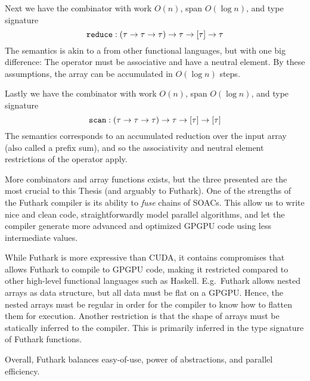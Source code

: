 Next we have the combinator  with work $O(n)$, span $O(\log n)$, and
type signature
\begin{equation}
\mathtt{reduce}:(\tau \to \tau \to \tau) \to \tau \to \mathtt{[}\tau\mathtt{]} \to \tau
\end{equation}
The semantics is akin to a  from other functional languages, but with
one big difference: The operator must be associative and have a neutral
element. By these assumptions, the array can be accumulated in $O(\log n)$
steps.

Lastly we have the combinator  with work $O(n)$, span $O(\log n)$, and
type signature
\begin{equation}
\mathtt{scan}:(\tau \to \tau \to \tau) \to \tau \to \mathtt{[}\tau\mathtt{]} \to \mathtt{[}\tau\mathtt{]}
\end{equation}
The semantics corresponds to an accumulated reduction over the input array (also
called a prefix sum), and so the associativity and neutral element restrictions
of the operator apply.

More combinators and array functions exists, but the three presented are the
most crucial to this Thesis (and arguably to Futhark). One of the strengths of
the Futhark compiler is its ability to \textit{fuse} chains of SOACs. This allow
us to write nice and clean code, straightforwardly model parallel algorithms,
and let the compiler generate more advanced and optimized GPGPU code using less
intermediate values.

While Futhark is more expressive than CUDA, it contains compromises that allows
Futhark to compile to GPGPU code, making it restricted compared to other
high-level functional languages such as Haskell. E.g.\ Futhark allows nested
arrays as data structure, but all data must be flat on a GPGPU. Hence, the
nested arrays must be regular in order for the compiler to know how to flatten
them for execution. Another restriction is that the shape of arrays must be
statically inferred to the compiler. This is primarily inferred in the
type signature of Futhark functions.

Overall, Futhark balances easy-of-use, power of abstractions, and parallel
efficiency.

